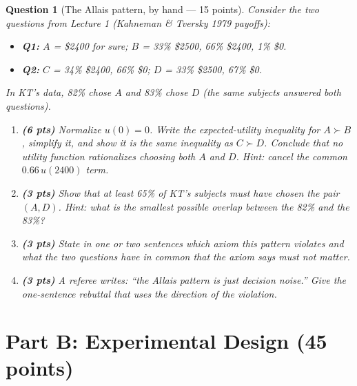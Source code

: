 \documentclass[11pt]{article}
\newtheorem{question}{Question}
\begin{document}
\begin{question}[The Allais pattern, by hand --- 15 points]
Consider the two questions from Lecture 1 (Kahneman \& Tversky 1979
payoffs):
\begin{itemize}[nosep]
  \item \textbf{Q1:} $A$ = \$2400 for sure; \quad
        $B$ = 33\% \$2500, 66\% \$2400, 1\% \$0.
  \item \textbf{Q2:} $C$ = 34\% \$2400, 66\% \$0; \quad
        $D$ = 33\% \$2500, 67\% \$0.
\end{itemize}
In KT's data, 82\% chose $A$ and 83\% chose $D$ (the same subjects
answered both questions).

\begin{enumerate}[label=(\alph*)]
  \item \textbf{(6 pts)} Normalize $u(0) = 0$. Write the expected-utility
        inequality for $A \succ B$, simplify it, and show it is the
        \emph{same} inequality as $C \succ D$. Conclude that no utility
        function rationalizes choosing both $A$ and $D$.
        \emph{Hint: cancel the common $0.66\,u(2400)$ term.}
  \item \textbf{(3 pts)} Show that at least 65\% of KT's subjects must have
        chosen the pair $(A, D)$. \emph{Hint: what is the smallest possible
        overlap between the 82\% and the 83\%?}
  \item \textbf{(3 pts)} State in one or two sentences which axiom this
        pattern violates and what the two questions have in common that the
        axiom says must not matter.
  \item \textbf{(3 pts)} A referee writes: ``the Allais pattern is just
        decision noise.'' Give the one-sentence rebuttal that uses the
        \emph{direction} of the violation.
\end{enumerate}
\end{question}

\section*{Part B: Experimental Design (45 points)}
\end{document}
